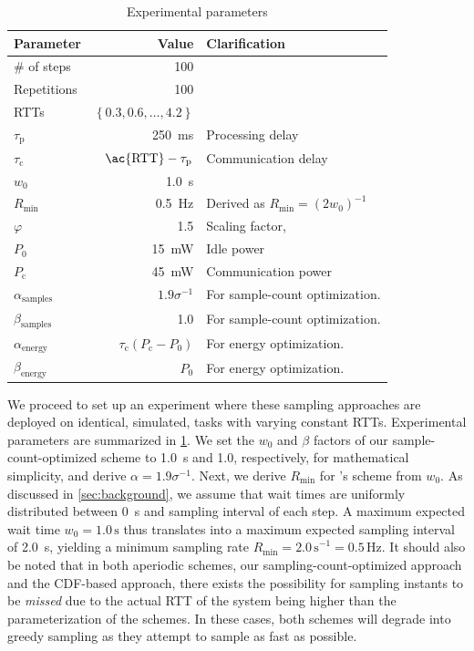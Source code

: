\begin{table}
    \centering
    \caption{Experimental parameters}\label{tab:params}
    \begin{tabular}{lrl}
        \toprule
        Parameter & Value & Clarification \\
        \midrule
        \# of steps & \num{100} & \\
        Repetitions & \num{100} & \\
        \acp{RTT} & \( \left\{ 0.3, 0.6,\ldots,4.2 \right\} \) & \\
        \( \tau_\text{p} \) & \SI{250}{\milli\second} & Processing delay \\
        \( \tau_\text{c} \) & \( \text{\ac{RTT}} - \tau_\text{p} \) & Communication delay \\
        \( w_0 \) & \SI{1.0}{\second} & \\
        \( R_\text{min} \) & \SI{0.5}{\hertz} & Derived as \( R_\text{min} = {(2 w_0)}^{-1} \) \\
        \( \varphi \) & \num{1.5} & Scaling factor, \textcite{Wang2019Towards}\\
        \( P_0 \) & \SI{15}{\milli\watt} & Idle power \\
        \( P_\text{c} \) & \SI{45}{\milli\watt} & Communication power \\
        \( \alpha_\text{samples} \) & \( 1.9 \sigma^{-1} \) & For sample-count optimization. \\
        \( \beta_\text{samples} \) & \num{1.0} & For sample-count optimization. \\
        \( \alpha_\text{energy} \) & \( \tau_\text{c}(P_\text{c} - P_0) \) & For energy optimization. \\
        \( \beta_\text{energy} \) & \( P_0 \) & For energy optimization. \\
        \bottomrule
    \end{tabular}
\end{table}

We proceed to set up an experiment where these sampling approaches are deployed on identical, simulated, tasks with varying constant \acp{RTT}.
Experimental parameters are summarized in \cref{tab:params}.
We set the \( w_0 \) and \( \beta \) factors of our sample-count-optimized scheme to \SI{1.0}{\second} and \num{1.0}, respectively, for mathematical simplicity, and derive \( \alpha = 1.9 \sigma^{-1} \).
Next, we derive \( R_\text{min} \) for \textcite{Wang2019Towards}'s scheme from \( w_0 \).
As discussed in \cref{sec:background}, we assume that wait times are uniformly distributed between \SI{0}{\second} and sampling interval of each step.
A maximum expected wait time \( w_0 = 1.0\,\si{\second} \) thus translates into a maximum expected sampling interval of \SI{2.0}{\second}, yielding a minimum sampling rate \( R_\text{min} = {2.0\,\si{\second}}^{-1} = 0.5\,\si{\hertz} \).
It should also be noted that in both aperiodic schemes, our sampling-count-optimized approach and the \ac{CDF}-based approach, there exists the possibility for sampling instants to be \emph{missed} due to the actual \ac{RTT} of the system being higher than the parameterization of the schemes.
In these cases, both schemes will degrade into greedy sampling as they attempt to sample as fast as possible.

